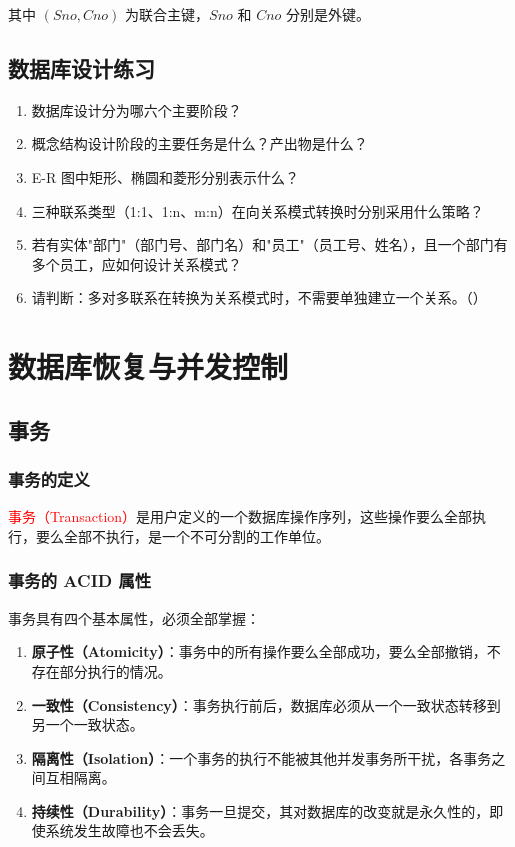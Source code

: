\documentclass{../../note}
\begin{document}
其中 $(Sno, Cno)$ 为联合主键，$Sno$ 和 $Cno$ 分别是外键。

\subsection{数据库设计练习}

\begin{enumerate}
  \item 数据库设计分为哪六个主要阶段？
  \item 概念结构设计阶段的主要任务是什么？产出物是什么？
  \item E-R 图中矩形、椭圆和菱形分别表示什么？
  \item 三种联系类型（1:1、1:n、m:n）在向关系模式转换时分别采用什么策略？
  \item 若有实体"部门"（部门号、部门名）和"员工"（员工号、姓名），且一个部门有多个员工，应如何设计关系模式？
  \item 请判断：多对多联系在转换为关系模式时，不需要单独建立一个关系。（\hspace{1cm}）
\end{enumerate}

\section{数据库恢复与并发控制}

\subsection{事务}

\subsubsection{事务的定义}

\textcolor{red}{事务（Transaction）}是用户定义的一个数据库操作序列，这些操作要么全部执行，要么全部不执行，是一个不可分割的工作单位。

\subsubsection{事务的 ACID 属性}

事务具有四个基本属性，必须全部掌握：

\begin{enumerate}
  \item \textbf{原子性（Atomicity）}：事务中的所有操作要么全部成功，要么全部撤销，不存在部分执行的情况。
  \item \textbf{一致性（Consistency）}：事务执行前后，数据库必须从一个一致状态转移到另一个一致状态。
  \item \textbf{隔离性（Isolation）}：一个事务的执行不能被其他并发事务所干扰，各事务之间互相隔离。
  \item \textbf{持续性（Durability）}：事务一旦提交，其对数据库的改变就是永久性的，即使系统发生故障也不会丢失。
\end{enumerate}
\end{document}
